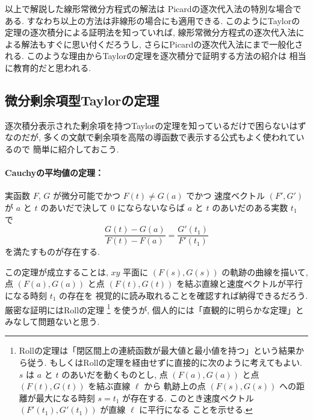 \documentclass[12pt,twoside]{jarticle}
\theoremstyle{jplain}
\theoremstyle{jplain}
\theoremstyle{jplain}
\numberwithin{theorem}{section}
\numberwithin{equation}{section}
\numberwithin{figure}{section}
\numberwithin{table}{section}
\begin{document}
以上で解説した線形常微分方程式の解法は
Picardの逐次代入法の特別な場合である.
すなわち以上の方法は非線形の場合にも適用できる.
このようにTaylorの定理の逐次積分による証明法を知っていれば, 
線形常微分方程式の逐次代入法による解法もすぐに思い付くだろうし, 
さらにPicardの逐次代入法にまで一般化される.
このような理由からTaylorの定理を逐次積分で証明する方法の紹介は
相当に教育的だと思われる.


\subsection{微分剰余項型Taylorの定理}

逐次積分表示された剰余項を持つTaylorの定理を知っているだけで困らないはずなのだが, 
多くの文献で剰余項を高階の導函数で表示する公式もよく使われているので
簡単に紹介しておこう.

\paragraph{Cauchyの平均値の定理：}
実函数 $F$, $G$ が微分可能でかつ $F(t)\ne G(a)$ でかつ
速度ベクトル $(F',G')$ が $a$ と $t$ のあいだで決して $0$ にならないならば
$a$ と $t$ のあいだのある実数 $t_1$ で
\[
\frac{G(t)-G(a)}{F(t)-F(a)}=\frac{G'(t_1)}{F'(t_1)}
\]
を満たすものが存在する.

この定理が成立することは, $xy$ 平面に $(F(s),G(s))$ の軌跡の曲線を描いて, 
点 $(F(a),G(a))$ と点 $(F(t),G(t))$ を結ぶ直線と速度ベクトルが平行になる時刻 $t_1$ の存在を
視覚的に読み取れることを確認すれば納得できるだろう.
厳密な証明にはRollの定理%
\footnote{Rollの定理は「閉区間上の連続函数が最大値と最小値を持つ」という結果から従う.
もしくはRollの定理を経由せずに直接的に次のように考えてもよい.
$s$ は $a$ と $t$ のあいだを動くものとし, 
点 $(F(a),G(a))$ と点 $(F(t),G(t))$ を結ぶ直線 $\ell$ から
軌跡上の点 $(F(s),G(s))$ への距離が最大になる時刻 $s=t_1$ が存在する.
このとき速度ベクトル $(F'(t_1),G'(t_1))$ が直線 $\ell$ に平行になる
ことを示せる.
}%
を使うが, 個人的には「直観的に明らかな定理」とみなして問題ないと思う.
\end{document}
